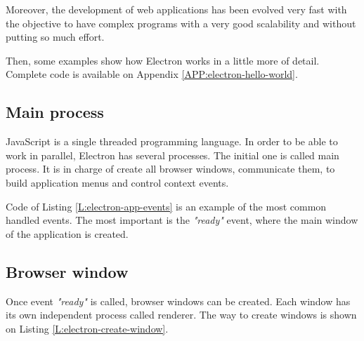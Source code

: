 Moreover, the development of web applications has been evolved very fast with
the objective to have complex programs with a very good scalability and without
putting so much effort.

Then, some examples show how Electron works in a little more of detail.
Complete code is available on Appendix \ref{APP:electron-hello-world}.

\subsection{Main process}


JavaScript is a single threaded programming language. In order to be able to
work in parallel, Electron has several processes. The initial one is called 
main process. It is in charge of create all browser windows, communicate them,
to build application menus and control context events.

\begin{codefigure}
\end{codefigure}

Code of Listing \ref{L:electron-app-events} is an example of the most common
handled events. The most important is the \textit{"ready"} event, where the
main window of the application is created.

\subsection{Browser window}

Once event \textit{"ready"} is called, browser windows can be created. Each
window has its own independent process called renderer. The way to create
windows is shown on Listing \ref{L:electron-create-window}.

\begin{codefigure}
\end{codefigure}

